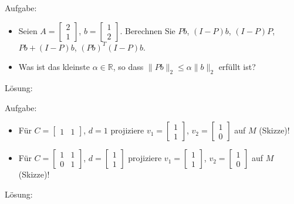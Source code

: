 \begin{uea}
Aufgabe:
\begin{itemize}
  \item[] Seien $A=\begin{bmatrix}
2\\1
\end{bmatrix}$, $b=\begin{bmatrix}
1\\2
\end{bmatrix}$. Berechnen Sie $Pb$, $(I-P)b$, $(I-P)P$, $Pb+(I-P)b$, $(Pb)^T(I-P)b$.
	\item[] Was ist das kleinste $\alpha\in\mathbb{R}$, so dass $\|Pb\|_2\le\alpha\|b\|_2$ erfüllt ist? 
\end{itemize}
Lösung:
\end{uea}


\begin{uea}
Aufgabe: 
\begin{itemize}
  \item[] Für $C=\begin{bmatrix}1 & 1 \end{bmatrix}$, $d=1$ projiziere $v_1=\begin{bmatrix}1 \\ 1 \end{bmatrix}$, $v_2=\begin{bmatrix}1 \\ 0 \end{bmatrix}$ auf $M$ (Skizze)!
  \item[] Für $C=\begin{bmatrix}1 & 1\\ 0 & 1 \end{bmatrix}$, $d=\begin{bmatrix} 1\\1\end{bmatrix}$ projiziere $v_1=\begin{bmatrix}1 \\ 1 \end{bmatrix}$, $v_2=\begin{bmatrix}1 \\ 0
  \end{bmatrix}$ auf $M$ (Skizze)!
\end{itemize}
Lösung: 
\end{uea}


